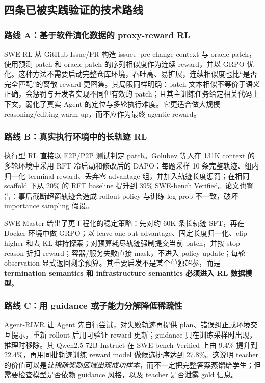\documentclass[10pt,a4paper,UTF8,fontset=none]{ctexart}
\begin{document}
\subsection{四条已被实践验证的技术路线}

\subsubsection{路线 A：基于软件演化数据的 proxy-reward RL}

SWE-RL 从 GitHub Issue/PR 构造 issue、pre-change context 与 oracle patch，使用预测 patch 和 oracle patch 的序列相似度作为连续 reward，并以 GRPO 优化\cite{zh:wei2025swerl}。这种方法不需要启动完整仓库环境，吞吐高、易扩展，连续相似度也比“是否完全匹配”的离散 reward 更密集。其局限同样明确：patch 文本相似不等价于语义正确，会惩罚与开发者实现不同但有效的 patch；且其主训练任务给定相关代码上下文，弱化了真实 Agent 的定位与多轮执行难度。它更适合做大规模 reasoning/editing warm-up，而不应作为最终 agentic reward。

\subsubsection{路线 B：真实执行环境中的长轨迹 RL}

执行型 RL 直接以 F2P/P2P 测试判定 patch。Golubev 等人在 131K context 的多轮环境中采用 RFT 冷启动和修改后的 DAPO：每题采样 10 条完整轨迹、组内归一化 terminal reward、丢弃零 advantage 组，并加入轨迹长度惩罚；在相同 scaffold 下从 20\% 的 RFT baseline 提升到 39\% SWE-bench Verified\cite{zh:golubev2025longcontextrl}。论文也警告：事后截断超窗轨迹会造成 rollout policy 与训练 log-prob 不一致，破坏 importance sampling 假设。

SWE-Master 给出了更工程化的稳定策略\cite{zh:song2026swemaster}：先对约 60K 条长轨迹 SFT，再在 Docker 环境中做 GRPO；以 leave-one-out advantage、固定长度归一化、clip-higher 和去 KL 维持探索；对预算耗尽轨迹强制提交当前 patch，并按 stop reason 折扣 reward；容器/服务失败直接 mask，不进入 policy update；每轮 observation 显式返回剩余预算。其重要启发不是某个单独超参，而是\textbf{termination semantics 和 infrastructure semantics 必须进入 RL 数据模型}。

\subsubsection{路线 C：用 guidance 或子能力分解降低稀疏性}

Agent-RLVR 让 Agent 先自行尝试，对失败轨迹再提供 plan、错误纠正或环境交互提示，重新 rollout 后用可验证 reward 更新；guidance 只在训练采样时出现，推理时移除\cite{zh:da2025agentrlvr}。其 Qwen2.5-72B-Instruct 在 SWE-bench Verified 上由 9.4\% 提升到 22.4\%，再用同批轨迹训练 reward model 做候选排序达到 27.8\%。这说明 teacher 的价值可以是\emph{让稀疏奖励区域出现成功样本}，而不一定把完整答案蒸馏给学生；但需要检查模型是否依赖 guidance 风格，以及 teacher 是否泄露 gold 信息。
\end{document}

